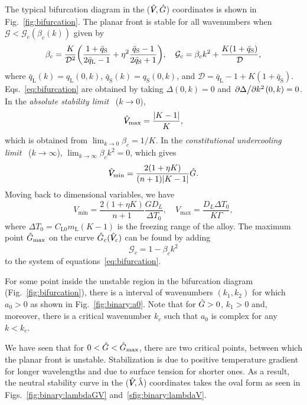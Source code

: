 \documentclass{article}
\newcommand{\liq}{\text{L}}
\newcommand{\sol}{\text{S}}
\newcommand{\qL}{q_\liq}
\newcommand{\qS}{q_\sol}
\newcommand{\bqL}{\bar{q}_\liq}
\newcommand{\bqS}{\bar{q}_\sol}
\newcommand{\hV}[1][\qty(\bar{V})]{\vphantom{#1}\mathrlap{\smash{\hat{V}}}V}
\newcommand{\hG}[1][\qty(\bar{G})]{\vphantom{#1}\smash{\hat{G}}}
\begin{document}
The typical bifurcation diagram in the ($\hV,\hG$) coordinates is shown in Fig.~\ref{fig:bifurcation}.
The planar front is stable for all wavenumbers when $\mathcal{G} < \mathcal{G}_c(\beta_c(k))$ given by
\begin{equation}\label{eq:bifurcation}
    \beta_c = \frac{K}{\mathcal{D}^2}\qty(\frac{1+\bqS}{2\bqL-1} + \eta^2\frac{\bqS-1}{2\bqS+1}), \quad
    \mathcal{G}_c = \beta_c k^2 + \frac{K(1+\bqS)}{\mathcal{D}},
\end{equation}
where $\bqL(k)=\qL(0,k)$, $\bqS(k)=\qS(0,k)$, and $\mathcal{D} = \bqL-1 + K(1+\bqS)$.
Eqs.~\eqref{eq:bifurcation} are obtained by taking $\Delta(0,k)=0$ and ${\pdv*{\Delta}{k^2}}(0,k)=0$.
In the \emph{absolute stability limit}~\cite{mullins1964stability} ($k\to0$),
\begin{equation}\label{eq:Vmax}
    \hV_\text{max} = \frac{|K-1|}{K},
\end{equation}
which is obtained from $\lim_{k\to0}\beta_c = 1/K$.
In the \emph{constitutional undercooling limit}~\cite{tiller1953redistribution} ($k\to\infty$),
$\lim_{k\to\infty}\beta_ck^2 = 0$, which gives
\begin{equation}\label{eq:Vmin}
    \hV_\text{min} = \frac{2(1+\eta K)}{(n+1)|K-1|}\hG.
\end{equation}
Moving back to dimensional variables, we have
\begin{equation}\label{eq:Vminmax}
    V_\text{min} = \frac{2(1+\eta K)}{n+1}\frac{GD_L}{\Delta{T}_0}, \quad
    V_\text{max} = \frac{D_L\Delta{T}_0}{K\Gamma},
\end{equation}
where $\Delta{T}_0 = C_{\liq0}m_\liq(K-1)$ is the freezing range of the alloy.
The maximum point $\hG_\text{max}$ on the curve $\hG_c(\hV_c)$ can be found by adding
\begin{equation}\label{eq:Gmax}
    \mathcal{G}_c = 1 - \beta_ck^2
\end{equation}
to the system of equations~\eqref{eq:bifurcation}.

For some point inside the unstable region in the bifurcation diagram (Fig.~\ref{fig:bifurcation}),
there is a interval of wavenumbers $(k_1,k_2)$
for which $a_0>0$ as shown in Fig.~\ref{fig:binary:a0}.
Note that for $\hG>0$, $k_1>0$ and, moreover, there is a critical wavenumber $k_c$
such that $a_0$ is complex for any $k<k_c$.

We have seen that for $0<\hG<\hG_\text{max}$, there are two critical points, between which the planar front is unstable.
Stabilization is due to positive temperature gradient for longer wavelengths
and due to surface tension for shorter ones.
As a result, the neutral stability curve in the ($\hV,\hat\lambda$) coordinates
takes the oval form as seen in Figs.~\ref{fig:binary:lambdaGV} and~\ref{sfig:binary:lambdaV}.
\end{document}
